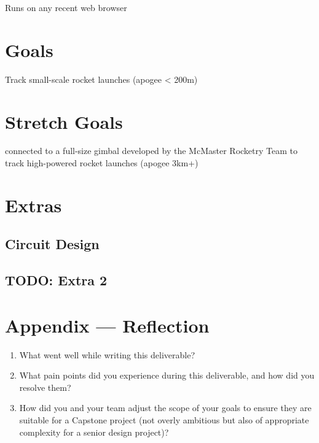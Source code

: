 \documentclass{article}
\begin{document}
Runs on any recent web browser

\section{Goals}

Track small-scale rocket launches (apogee < 200m)

\section{Stretch Goals}

connected to a full-size gimbal developed by the McMaster Rocketry Team to track high-powered rocket launches (apogee 3km+)

\section{Extras}


\subsection{Circuit Design}

\subsection{TODO: Extra 2}


\newpage{}

\section*{Appendix --- Reflection}




\begin{enumerate}
    \item What went well while writing this deliverable? 
    \item What pain points did you experience during this deliverable, and how
    did you resolve them?
    \item How did you and your team adjust the scope of your goals to ensure
    they are suitable for a Capstone project (not overly ambitious but also of
    appropriate complexity for a senior design project)?
\end{enumerate}  
\end{document}
